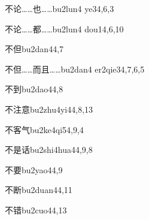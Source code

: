 \begin{verbete}{不论……也……}{bu2lun4 ye3}{4,6,3}
\end{verbete}

\begin{verbete}{不论……都……}{bu2lun4 dou1}{4,6,10}
\end{verbete}

\begin{verbete}{不但}{bu2dan4}{4,7}
\end{verbete}

\begin{verbete}{不但……而且……}{bu2dan4 er2qie3}{4,7,6,5}
\end{verbete}

\begin{verbete}{不到}{bu2dao4}{4,8}
\end{verbete}

\begin{verbete}{不注意}{bu2zhu4yi4}{4,8,13}
\end{verbete}

\begin{verbete}{不客气}{bu2ke4qi5}{4,9,4}
\end{verbete}

\begin{verbete}{不是话}{bu2shi4hua4}{4,9,8}
\end{verbete}

\begin{verbete}{不要}{bu2yao4}{4,9}
\end{verbete}

\begin{verbete}{不断}{bu2duan4}{4,11}
\end{verbete}

\begin{verbete}{不错}{bu2cuo4}{4,13}
\end{verbete}


